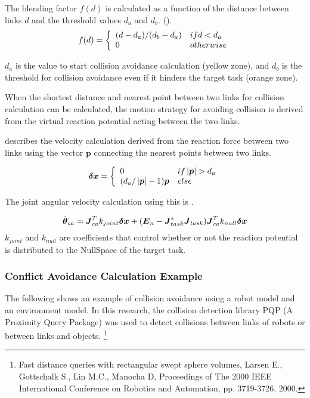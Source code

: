The blending factor $f(d)$ is calculated as a function of the distance between links $d$ and the threshold values $d_a$ and $d_b$.
().
\begin{eqnarray}
\labeq{collision-avoidance-blending-coefficient}
 f(d) =
  \left\{
   \begin{array}{l l}
     (d-d_a)/(d_b-d_a) & if d<d_a\\
     0 & otherwise
    \end{array}
  \right.
\end{eqnarray}

$d_a$ is the value to start collision avoidance calculation
(yellow zone), 
and $d_b$ is the threshold for collision avoidance even if it hinders the target task (orange zone).


When the shortest distance and nearest point between two links for collision calculation can be calculated, the motion strategy for avoiding collision is derived from the virtual reaction potential acting between the two links.

 describes the velocity calculation derived from the reaction force between two links using the vector $\bm{p}$ connecting the nearest points between two links.

\begin{eqnarray}
  \labeq{collision-avoidance-distance-force}
  \bm{\delta x} =
  \left\{
   \begin{array}{l l}
     0 & if \left|\bm{p}\right|>d_{a}\\
     (d_{a}/\left|\bm{p}\right|-1)\bm{p} & else
    \end{array}
  \right.
\end{eqnarray}

The joint angular velocity calculation using this is .

\begin{equation}
\labeq{collision-avoidance-joint-speed}
\dot{\bm{\theta}}_{ca} = \bm{J}_{ca}^{T} k_{joint} \bm{\delta x}
+ (\bm{E}_n - \bm{J}_{task}^{*}\bm{J}_{task}) \bm{J}_{ca}^{T} k_{null} \bm{\delta x}
\end{equation}
$k_{joint}$ and $k_{null}$ are coefficients that control whether or not the reaction potential is distributed to the NullSpace of the target task.


\subsubsection{Conflict Avoidance Calculation Example}
The following shows an example of collision avoidance using a robot model and an environment model.
In this research, the collision detection library PQP (A Proximity Query Package) was used to detect collisions between links of robots or between links and objects.
\footnote{
Fast distance queries with rectangular swept sphere volumes,
Larsen E., Gottschalk S., Lin M.C., Manocha D, 
Proceedings of The 2000 IEEE International Conference on Robotics and Automation, pp. 3719-3726, 2000.
}

